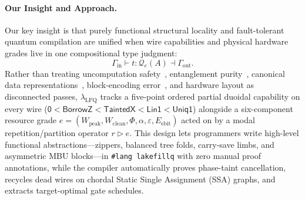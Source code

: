 \documentclass[acmsmall,screen,anonymous]{acmart}
\DeclareRobustCommand{\_}{\ifmmode\text{\char95}\else\char95\penalty0\relax\fi}
\theoremstyle{plain}
\newcommand{\CapZero}{\ensuremath{\mathsf{0}}}
\newcommand{\CapBorrowZ}{\ensuremath{\mathsf{BorrowZ}}}
\newcommand{\CapTaintedX}{\ensuremath{\mathsf{TaintedX}}}
\newcommand{\CapLin}{\ensuremath{\mathsf{Lin1}}}
\newcommand{\CapUniq}{\ensuremath{\mathsf{Uniq1}}}
\begin{document}
\paragraph{Our Insight and Approach.}
Our key insight is that purely functional structural locality and fault-tolerant quantum compilation are unified when wire capabilities and physical hardware grades live in one compositional type judgment:
\[
  \Gamma_{\mathrm{in}} \vdash t : \mathcal{Q}_{e}(A) \dashv \Gamma_{\mathrm{out}}.
\]
Rather than treating uncomputation safety~\cite{bichsel2020}, entanglement purity~\cite{yuan2022twist}, canonical data representations~\cite{yuan2022tower}, block-encoding error~\cite{cobble2026}, and hardware layout as disconnected passes, $\lambda_{\mathrm{LFQ}}$ tracks a five-point ordered partial duoidal capability on every wire ($\CapZero < \CapBorrowZ < \CapTaintedX < \CapLin < \CapUniq$) alongside a six-component resource grade $e = (W_{\mathrm{peak}}, W_{\mathrm{clean}}, \Phi, \alpha, \varepsilon, E_{\mathrm{ebit}})$ acted on by a modal repetition/partition operator $r \triangleright e$. This design lets programmers write high-level functional abstractions---zippers, balanced tree folds, carry-save limbs, and asymmetric MBU blocks---in \texttt{\#lang lakefillq} with zero manual proof annotations, while the compiler automatically proves phase-taint cancellation, recycles dead wires on chordal Static Single Assignment (SSA) graphs, and extracts target-optimal gate schedules.
\end{document}

